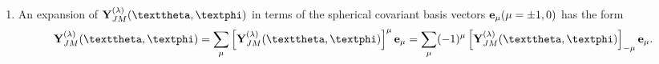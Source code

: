 \begin{enumerate}[label=(\alph*)]
\begin{fleqn}[1cm]
\begin{align}
\left[\vect{Y}_{J M}^{J+1}(\vartheta, \varphi)\right]^{0}&=\left[\vect{Y}_{J M}^{J+1}(\vartheta, \varphi)\right]_{0}=-\left[\frac{(J-M+1)(J+M+1)}{(J+1)(2 J+3)}\right]^{\frac{1}{2}} Y_{J+1 M}(\vartheta, \varphi), \label{eq:7:3:15}\\
\left[\vect{Y}_{J M}^{J+1}(\vartheta, \varphi)\right]^{-1}&=-\left[\vect{Y}_{J M}^{J+1}(\vartheta, \varphi)\right]_{+1}=\left[\frac{(J+M+1)(J+M+2)}{2(J+1)(2 J+3)}\right]^{\frac{1}{2}} Y_{J+1 M+1}(\vartheta, \varphi), \notag
\end{align}
\begin{align}
\left[\vect{Y}_{J M}^{J}(\vartheta, \varphi)\right]^{+1}&=-\left[\vect{Y}_{J M}^{J}(\vartheta, \varphi)\right]_{-1}=-\left[\frac{(J+M)(J-M+1)}{2 J(J+1)}\right]^{\frac{1}{2}} Y_{J M-1}(\vartheta, \varphi), \notag\\
\left[\vect{Y}_{J M}^{J}(\vartheta, \varphi)\right]^{0}&=\left[\vect{Y}_{J M}^{J}(\vartheta, \varphi)\right]_{0}=\frac{M}{\sqrt{J(J+1)}} Y_{J M}(\vartheta, \varphi), \label{eq:7:3:16}\\
\left[\vect{Y}_{J M}^{J}(\vartheta, \varphi)\right]^{-1}&=-\left[\vect{Y}_{J M}^{J}(\vartheta, \varphi)\right]_{+1}=\left[\frac{(J-M)(J+M+1)}{2 J(J+1)}\right]^{\frac{1}{2}} Y_{J M+1}(\vartheta, \varphi). \notag
\end{align}
\begin{align}
\left[\vect{Y}_{J M}^{J-1}(\vartheta, \varphi)\right]^{+1} & =-\left[\vect{Y}_{J M}^{J-1}(\vartheta, \varphi)\right]_{-1}=\left[\frac{(J+M)(J+M-1)}{2 J(2 J-1)}\right]^{\frac{1}{2}} Y_{J-1 M-1}(\vartheta, \varphi), \notag\\
\left[\vect{Y}_{J M}^{J-1}(\vartheta, \varphi)\right]^{0}  & =\left[\vect{Y}_{J M}^{J-1}(\vartheta, \varphi)\right]_{0}=\left[\frac{(J-M)(J+M)}{J(2 J-1)}\right]^{\frac{1}{2}} Y_{J-1 M}(\vartheta, \varphi), \label{eq:7:3:17}\\
\left[\vect{Y}_{J M}^{J-1}(\vartheta, \varphi)\right]^{-1}  & =-\left[\vect{Y}_{J M}^{J-1}(\vartheta, \varphi)\right]_{+1}=\left[\frac{(J-M)(J-M-1)}{2 J(2 J-1)}\right]^{\frac{1}{2}} Y_{J-1 M+1}(\vartheta, \varphi). \notag
\end{align}
\end{fleqn}
\item 
 An expansion of $\vect{Y}_{J M}^{(\lambda)}(\vartheta, \varphi)$ in terms of the spherical covariant basis vectors $\mathbf{e}_{\mu}(\mu= \pm 1,0)$ has the form
\begin{equation}
\vect{Y}_{J M}^{(\lambda)}(\vartheta, \varphi)=\sum_{\mu}\left[\vect{Y}_{J M}^{(\lambda)}(\vartheta, \varphi)\right]^{\mu} \vect{e}_{\mu}=\sum_{\mu}(-1)^{\mu}\left[\vect{Y}_{J M}^{(\lambda)}(\vartheta, \varphi)\right]_{-\mu} \vect{e}_{\mu}. \label{eq:7:3:18}

\end{equation}
\end{enumerate}
